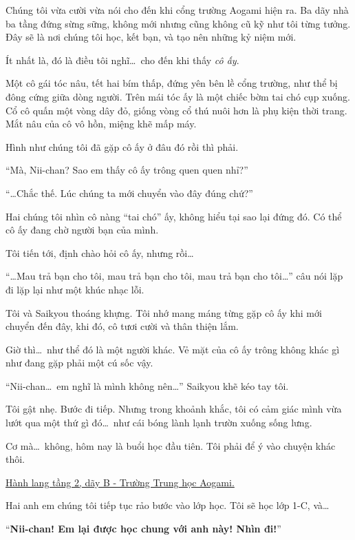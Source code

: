 \documentclass[../main.tex]{subfiles}
\begin{document}
Chúng tôi vừa cười vừa nói cho đến khi cổng trường Aogami hiện ra. Ba dãy nhà ba tầng đứng sừng sững, không mới nhưng cũng không cũ kỹ như tôi từng tưởng. Đây sẽ là nơi chúng tôi học, kết bạn, và tạo nên những kỷ niệm mới.

Ít nhất là, đó là điều tôi nghĩ\dots\ cho đến khi thấy \emph{cô ấy}.


Một cô gái tóc nâu, tết hai bím thấp, đứng yên bên lề cổng trường, như thể bị đông cứng giữa dòng người. Trên mái tóc ấy là một chiếc bờm tai chó cụp xuống. Cổ cô quấn một vòng dây đỏ, giống vòng cổ thú nuôi hơn là phụ kiện thời trang. Mắt nâu của cô vô hồn, miệng khẽ mấp máy.

Hình như chúng tôi đã gặp cô ấy ở đâu đó rồi thì phải.

``Mà, Nii-chan? Sao em thấy cô ấy trông quen quen nhỉ?''

``\dots Chắc thế. Lúc chúng ta mới chuyển vào đây đúng chứ?''

Hai chúng tôi nhìn cô nàng ``tai chó'' ấy, không hiểu tại sao lại đứng đó. Có thể cô ấy đang chờ người bạn của mình.

Tôi tiến tới, định chào hỏi cô ấy, nhưng rồi\dots

``\dots Mau trả bạn cho tôi, mau trả bạn cho tôi, mau trả bạn cho tôi\dots'' câu nói lặp đi lặp lại như một khúc nhạc lỗi.

Tôi và Saikyou thoáng khựng. Tôi nhớ mang máng từng gặp cô ấy khi mới chuyển đến đây, khi đó, cô tươi cười và thân thiện lắm.

Giờ thì\dots\ như thể đó là một người khác. Vẻ mặt của cô ấy trông không khác gì như đang gặp phải một cú sốc vậy.

``Nii-chan\dots\ em nghĩ là mình không nên\dots'' Saikyou khẽ kéo tay tôi.

Tôi gật nhẹ. Bước đi tiếp. Nhưng trong khoảnh khắc, tôi có cảm giác mình vừa lướt qua một thứ gì đó\dots\ như cái bóng lành lạnh trườn xuống sống lưng.

Cơ mà\dots\ không, hôm nay là buổi học đầu tiên. Tôi phải để ý vào chuyện khác thôi.

\ct

\begin{center}
  \uline{Hành lang tầng 2, dãy B - Trường Trung học Aogami.}
\end{center}

Hai anh em chúng tôi tiếp tục rảo bước vào lớp học. Tôi sẽ học lớp 1-C, và\dots

``\textbf{Nii-chan! Em lại được học chung với anh này! Nhìn đi!}''
\end{document}
